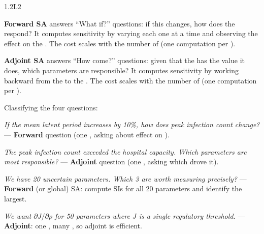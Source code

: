 \begin{solution}{1.2}{L2}

\solanswer

\textbf{Forward SA} answers ``What if?'' questions: if this \POI changes,
how does the \QOI respond? It computes sensitivity by varying each
\POI one at a time and observing the effect on the \QOI. The cost
scales with the number of \POIs (one computation per \POI).

\textbf{Adjoint SA} answers ``How come?'' questions: given that the
\QOI has the value it does, which parameters are responsible?
It computes sensitivity by working backward from the \QOI to the \POIs.
The cost scales with the number of \QOIs (one computation per \QOI).

\smallskip
Classifying the four questions:

 \emph{If the mean latent period increases by 10\%, how does
peak infection count change?} --- \textbf{Forward} question (one \POI,
asking about effect on \QOI).

 \emph{The peak infection count exceeded the hospital capacity.
Which parameters are most responsible?} --- \textbf{Adjoint} question
(one \QOI, asking which \POIs drove it).

 \emph{We have 20 uncertain parameters. Which 3 are worth
measuring precisely?} --- \textbf{Forward} (or global) SA: compute SIs
for all 20 parameters and identify the largest.

 \emph{We want $\partial J/\partial p$ for 50 parameters where
$J$ is a single regulatory threshold.} --- \textbf{Adjoint}: one \QOI,
many \POIs, so adjoint is efficient.


\end{solution}

